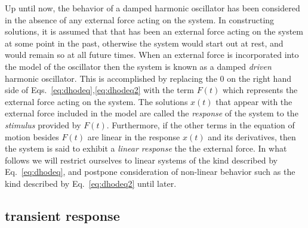 \documentclass{revtex4}
\begin{document}
Up until now, the behavior of a damped harmonic oscillator has been
considered in the absence of any external force acting on the system.
In constructing solutions, it is assumed that that has been an external
force acting on the system at some point in the past, otherwise the system
would start out at rest, and would remain so at all future times.  When
an external force is incorporated into the model of the oscillator then
the system is known as a damped {\em driven} harmonic oscillator.  This is
accomplished by replacing the 0 on the right hand side of 
Eqs.~\ref{eq:dhodeq},\ref{eq:dhodeq2} with the term $F(t)$ which represents
the external force acting on the system.  The solutions $x(t)$ that appear
with the external force included in the model are called the {\em response}
of the system to the {\em stimulus} provided by $F(t)$.  Furthermore, if
the other terms in the equation of motion besides $F(t)$ are linear in the
response $x(t)$ and its derivatives, then the system is said to exhibit a
{\em linear response} the the external force.  In what follows we will
restrict ourselves to linear systems of the kind described by
Eq.~\ref{eq:dhodeq}, and postpone consideration of non-linear behavior
such as the kind described by Eq.~\ref{eq:dhodeq2} until later.

\subsection{transient response}
\end{document}
